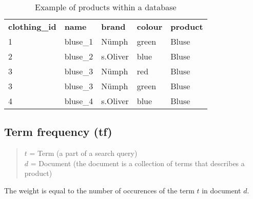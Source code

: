 \begin{table}[h]
    \begin{center}
    \begin{tabular}{ l l l l l }
        \rowcolor{Gray}
        \textbf{clothing\_id}   & \textbf{name} & \textbf{brand}    & \textbf{colour}   & \textbf{product}\\
        1                       & bluse\_1      & N\"umph           & green             & Bluse\\
        2                       & bluse\_2      & s.Oliver          & blue              & Bluse\\
        3                       & bluse\_3      & N\"umph           & red               & Bluse\\
        3                       & bluse\_3      & N\"umph           & green             & Bluse\\
        4                       & bluse\_4      & s.Oliver          & blue              & Bluse\\
    \end{tabular}
    \caption{Example of products within a database}
    \end{center}
\end{table}

\bigskip

\subsection{Term frequency (tf)}

\begin{quote}
    $t$ = Term (a part of a search query)\\
    $d$ = Document (the document is a collection of terms that describes a product)
\end{quote}
The weight is equal to the number of occurences of the term $t$ in document $d$.

